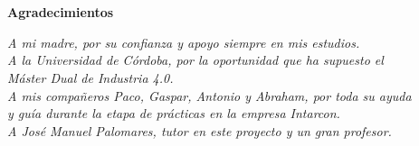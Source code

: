 \chapter*{}

\begin{flushright}
    \Huge{\textbf{Agradecimientos}}
\end{flushright}
\vspace{10mm}
\begin{flushright}
    \textit{A mi madre, por su confianza y apoyo siempre en mis estudios. \\
    A la Universidad de Córdoba, por la oportunidad que ha supuesto el \\ Máster Dual de Industria 4.0. \\
    A mis compañeros Paco, Gaspar, Antonio y Abraham, por toda su ayuda \\ y guía durante la etapa de prácticas en la empresa Intarcon. \\
    A José Manuel Palomares, tutor en este proyecto y un gran profesor.}
\end{flushright}